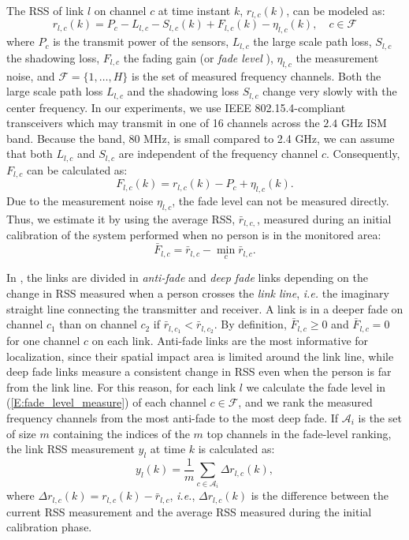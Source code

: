 \documentclass[conference]{IEEEtran}
\begin{document}
The RSS of link $l$ on channel $c$ at time instant $k$, $r_{l,c}(k)$,
can be modeled as:
\begin{equation} \label{E:RSS}
 r_{l,c}(k) = P_{c} - L_{l,c} - S_{l,c}(k) + F_{l,c}(k) - \eta_{l,c}(k), \quad c \in \mathcal{F}
\end{equation}
where $P_{c}$ is the transmit power of the sensors, $L_{l,c}$ the
large scale path loss, $S_{l,c}$ the shadowing loss, $F_{l,c}$ the
fading gain (or \emph{fade level} \cite{Wilson_SkewL_2011}),
$\eta_{l,c}$ the measurement noise, and $\mathcal{F} = \{1, \ldots,
H\}$ is the set of measured frequency channels. Both the large scale
path loss $L_{l,c}$ and the shadowing loss $S_{l,c}$ change very
slowly with the center frequency. In our experiments, we use IEEE
802.15.4-compliant transceivers \cite{tidongle} which may transmit in
one of 16 channels across the $2.4$ GHz ISM band.  Because the band,
80 MHz, is small compared to 2.4 GHz, we can assume that both
$L_{l,c}$ and $S_{l,c}$ are independent of the frequency channel
$c$. Consequently, $F_{l,c}$ can be calculated as:
\begin{equation} \label{E:fade_level}
F_{l,c}(k) = r_{l,c}(k) - P_{c} + \eta_{l,c}(k).
\end{equation}
Due to the measurement noise $\eta_{l,c}$, the fade level can not be
measured directly. Thus, we estimate it by using the average RSS,
$\bar{r}_{l,c,}$, measured during an initial calibration of the system
performed when no person is in the monitored area:
\begin{equation} \label{E:fade_level_measure}
\bar{F}_{l,c} = \bar{r}_{l,c} - \min_{c}\bar{r}_{l,c}.
\end{equation}

In \cite{Wilson_SkewL_2011}, the links are divided in \emph{anti-fade}
and \emph{deep fade} links depending on the change in RSS measured
when a person crosses the \emph{link line}, \emph{i.e.} the imaginary
straight line connecting the transmitter and receiver. A link is in a
deeper fade on channel $c_1$ than on channel $c_2$ if $\bar{r}_{l,c_1}
< \bar{r}_{l,c_2}$. By definition, $\bar{F}_{l,c} \ge 0$ and
$\bar{F}_{l,c} = 0$ for one channel $c$ on each link. Anti-fade links
are the most informative for localization, since their spatial impact
area is limited around the link line, while deep fade links measure a
consistent change in RSS even when the person is far from the link
line. For this reason, for each link $l$ we calculate the fade level
in (\ref{E:fade_level_measure}) of each channel $c \in \mathcal{F}$,
and we rank the measured frequency channels from the most anti-fade to
the most deep fade. If $\mathcal{A}_i$ is the set of size $m$
containing the indices of the $m$ top channels in the fade-level
ranking, the link RSS measurement $y_l$ at time $k$ is calculated as:
\begin{equation}\label{E:MASS_RSS_change}
y_{l}(k) =  \frac{1}{m} \sum_{c \in \mathcal{A}_i} \Delta r_{l,c}(k),
\end{equation}
where $\Delta r_{l,c}(k) = r_{l,c}(k) - \bar{r}_{l,c}$, \emph{i.e.},
$\Delta r_{l,c}(k)$ is the difference between the current RSS
measurement and the average RSS measured during the initial
calibration phase.
\end{document}
